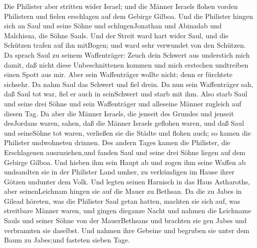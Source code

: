  Die Philister aber stritten wider Israel; und die Männer
Israels flohen vorden Philistern und fielen erschlagen auf dem Gebirge
Gilboa.  Und die Philister hingen sich an Saul und seine
Söhne und schlugenJonathan und Abinadab und Malchisua, die Söhne Sauls.
 Und der Streit ward hart wider Saul, und die Schützen
trafen auf ihn mitBogen; und ward sehr verwundet von den Schützen.
 Da sprach Saul zu seinem Waffenträger: Zeuch dein Schwert
aus understich mich damit, daß nicht diese Unbeschnittenen kommen und
mich erstechen undtreiben einen Spott aus mir. Aber sein Waffenträger
wollte nicht; denn er fürchtete sichsehr. Da nahm Saul das Schwert und
fiel drein.  Da nun sein Waffenträger sah, daß Saul tot war,
fiel er auch in seinSchwert und starb mit ihm.  Also starb
Saul und seine drei Söhne und sein Waffenträger und alleseine Männer
zugleich auf diesen Tag.  Da aber die Männer Israels, die
jenseit des Grundes und jenseit desJordans waren, sahen, daß die Männer
Israels geflohen waren, und daß Saul und seineSöhne tot waren, verließen
sie die Städte und flohen auch; so kamen die Philister undwohneten
drinnen.  Des andern Tages kamen die Philister, die
Erschlagenen auszuziehen,und fanden Saul und seine drei Söhne liegen auf
dem Gebirge Gilboa.  Und hieben ihm sein Haupt ab und zogen
ihm seine Waffen ab undsandten sie in der Philister Land umher, zu
verkündigen im Hause ihrer Götzen undunter dem Volk.  Und
legten seinen Harnisch in das Haus Astharoths, aber seinenLeichnam
hingen sie auf die Mauer zu Bethsan.  Da die zu Jabes in
Gilead höreten, was die Philister Saul getan hatten, 
machten sie sich auf, was streitbare Männer waren, und gingen dieganze
Nacht und nahmen die Leichname Sauls und seiner Söhne von der
MauerBethsans und brachten sie gen Jabes und verbrannten sie daselbst.
 Und nahmen ihre Gebeine und begruben sie unter dem Baum zu
Jabes;und fasteten sieben Tage.
